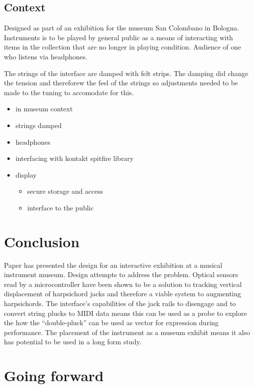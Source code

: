 \subsection{Context}\label{context}

Designed as part of an exhibition for the museum San Colombano in
Bologna. Instruments is to be played by general public as a means of
interacting with items in the collection that are no longer in playing
condition. Audience of one who listens via headphones.

The strings of the interface are damped with felt strips. The damping
did change the tension and thereforew the feel of the strings so
adjustments needed to be made to the tuning to accomodate for this.

\begin{itemize}
\item
  in museum context
\item
  strings damped
\item
  headphones
\item
  interfacing with kontakt spitfire library
\item
  display

  \begin{itemize}
  \item
    secure storage and access
  \item
    interface to the public
  \end{itemize}
\end{itemize}



\section{Conclusion}\label{conclusion}

Paper has presented the design for an interactive exhibition at a musical instrument museum. Design attempts to address the problem.
Optical sensors read by a microcontroller have been shown to be a solution to tracking vertical displacement of harpsichord jacks and therefore a viable system to augmenting harpsichords. The interface's capabilities of the jack rails to disengage and to convert string plucks to MIDI data means this can be used as a probe to explore the how the ``double-pluck'' can be used as vector for expression during performance. The placement of the instrument as a museum exhibit means it also has potential to be used in a long form study.

\section{Going forward}\label{going-forward}

